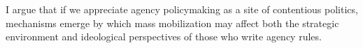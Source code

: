 








































I argue that if we appreciate agency policymaking as a site of contentious politics, mechanisms emerge by which mass mobilization may affect both the strategic environment and ideological perspectives of those who write agency rules. %



